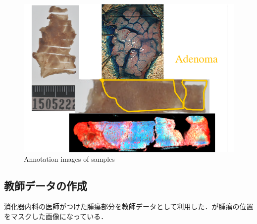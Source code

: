 \begin{figure}[H]
\begin{minipage}{0.45\columnwidth}
	\end{minipage}
	\begin{minipage}{0.45\linewidth}
		\centering
		\includegraphics[clip, angle=270, width=\linewidth]{fig/raw_data/summary/C-011}
	\end{minipage}
	
	\caption{Annotation images of samples}
	\label{fig:検体アノテーション}
	
\end{figure}






\subsection{教師データの作成}
消化器内科の医師がつけた腫瘍部分を教師データとして利用した．が腫瘍の位置をマスクした画像になっている．

